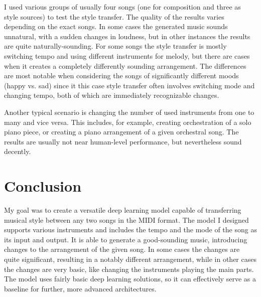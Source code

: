 \documentclass[en]{pracamgr}
\begin{document}
I used various groups of usually four songs (one for composition and three as style sources) to test the style transfer.
The quality of the results varies depending on the exact songs.
In some cases the generated music sounds unnatural, with a sudden changes in loudness, but in other instances the results are quite naturally-sounding.
For some songs the style transfer is mostly switching tempo and using different instruments for melody, but there are cases when it creates a completely differently sounding arrangement.
The differences are most notable when considering the songs of significantly different moods (happy vs. sad) since it this case style transfer often involves switching mode and changing tempo, both of which are immediately recognizable changes.

Another typical scenario is changing the number of used instruments from one to many and vice versa. This includes, for example, creating orchestration of a solo piano piece, or creating a piano arrangement of a given orchestral song.
The results are usually not near human-level performance, but nevertheless sound decently.

\chapter{Conclusion}

My goal was to create a versatile deep learning model capable of transferring musical style between any two songs in the MIDI format.
The model I designed supports various instruments and includes the tempo and the mode of the song as its input and output.
It is able to generate a good-sounding music, introducing changes to the arrangement of the given song.
In some cases the changes are quite significant, resulting in a notably different arrangement, while in other cases the changes are very basic, like changing the instruments playing the main parts.
The model uses fairly basic deep learning solutions, so it can effectively serve as a baseline for further, more advanced architectures.
\end{document}
